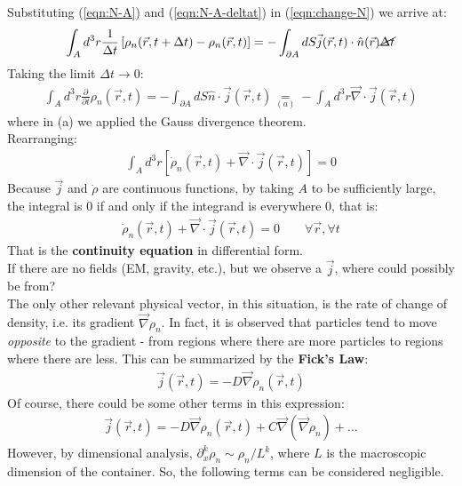 \documentclass[../template.tex]{subfiles}
\begin{document}
Substituting (\ref{eqn:N-A}) and (\ref{eqn:N-A-deltat}) in (\ref{eqn:change-N}) we arrive at:
\begin{align*}
\int_A d^3r \frac{1}{\Delta t} \left[\rho_n(\vec{r},t+\Delta t)- \rho_n(\vec{r},t) \right] = -\int_{\partial A} dS \vec{j}(\vec{r},t)\cdot \hat{n}(\vec{r}) \cancel{\Delta t}
\end{align*}
Taking the limit $\Delta t\to 0$:
\begin{align*}
\int_A d^3r \frac{\partial}{\partial t}\rho_n(\vec{r},t) = -\int_{\partial A} dS \hat{n} \cdot \vec{j}(\vec{r},t) \underset{(a)}{=} - \int_A d^3r \vec{\nabla} \cdot \vec{j}(\vec{r},t)
\end{align*}
where in (a) we applied the Gauss divergence theorem.\\
Rearranging:
\begin{align*}
\int_A d^3r [\dot{\rho}_n(\vec{r},t) + \vec{\nabla}\cdot \vec{j}(\vec{r},t)] = 0
\end{align*}
Because $\vec{j}$ and $\dot{\rho}$ are continuous functions, by taking $A$ to be sufficiently large, the integral is $0$ if and only if the integrand is everywhere $0$, that is:
\begin{align}
\dot{\rho}_n (\vec{r},t) + \vec{\nabla} \cdot \vec{j}(\vec{r},t) = 0 \qquad \forall \vec{r}, \forall t
\label{eqn:continuity}
\end{align} 
That is the \textbf{continuity equation} in differential form.\\

If there are no fields (EM, gravity, etc.), but we observe a $\vec{j}$, where could possibly be from?\\
The only other relevant physical vector, in this situation, is the  rate of change of density, i.e. its gradient $\vec{\nabla}\rho_n$. In fact, it is observed that particles tend to move \textit{opposite} to the gradient - from regions where there are more particles to regions where there are less. This can be summarized by the \textbf{Fick's Law}:
\begin{align}
\vec{j}(\vec{r},t) = -D\vec{\nabla} \rho_n(\vec{r},t)
\label{eqn:fickslaw}
\end{align}
Of course, there could be some other terms in this expression:
\begin{align*}
\vec{j}(\vec{r},t) = -D\vec{\nabla} \rho_n(\vec{r},t) + C\vec{\nabla}(\vec{\nabla}\rho_n) + \dots
\end{align*}
However, by dimensional analysis, $\partial_x^k \rho_n \sim \rho_n/L^k$, where $L$ is the macroscopic dimension of the container. So, the following terms can be considered negligible.\\
\end{document}
